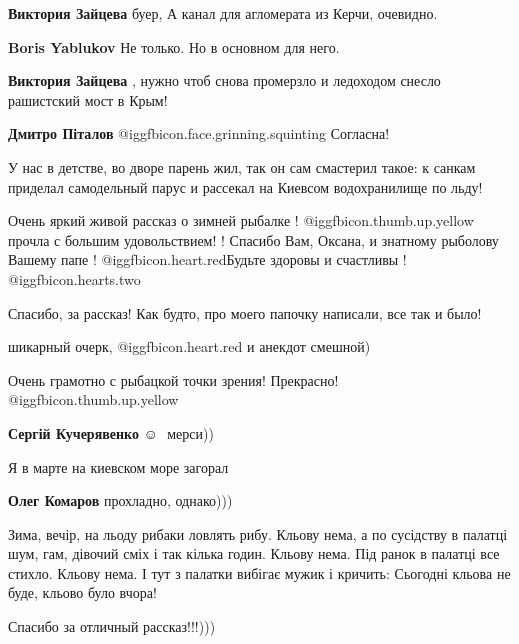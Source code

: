 \begin{itemize}
{\begin{itemize} %
\textbf{Виктория Зайцева} буер, А канал для агломерата из Керчи, очевидно.

\textbf{Boris Yablukov} Не только. Но в основном для него.

\textbf{Виктория Зайцева} , нужно чтоб снова промерзло и ледоходом снесло рашистский мост в Крым!

\textbf{Дмитро Піталов}  @igg{fbicon.face.grinning.squinting} Согласна!
\end{itemize} %


У нас в детстве, во дворе парень жил, так он сам смастерил такое: к санкам
приделал самодельный парус и рассекал на Киевсом водохранилище по льду!


Очень яркий живой рассказ о зимней рыбалке !  @igg{fbicon.thumb.up.yellow} прочла с большим удовольствием!
! Спасибо Вам, Оксана, и знатному рыболову Вашему папе ! @igg{fbicon.heart.red}Будьте здоровы и
счастливы ! @igg{fbicon.hearts.two} 


Спасибо, за рассказ! Как будто, про моего папочку написали, все так и было!

шикарный очерк, @igg{fbicon.heart.red}
и анекдот смешной)

Очень грамотно с рыбацкой точки зрения! Прекрасно! @igg{fbicon.thumb.up.yellow} 

\textbf{Сергій Кучерявенко}  ☺ ️ мерси))

Я в марте на киевском море загорал

\textbf{Олег Комаров} прохладно, однако)))


Зима, вечір, на льоду рибаки ловлять рибу. Кльову нема, а по сусідству в
палатці шум, гам, дівочий сміх і так кілька годин. Кльову нема. Під ранок в
палатці все стихло. Кльову нема. І тут з палатки вибігає мужик і кричить:
Сьогодні кльова не буде, кльово було вчора!

Спасибо за отличный рассказ!!!)))


}
\end{itemize}
